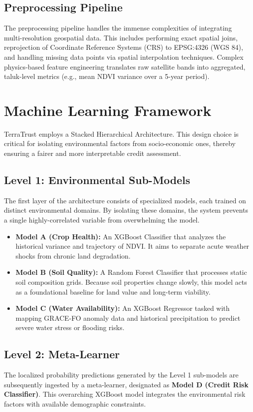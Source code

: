 \documentclass[conference]{IEEEtran}
\begin{document}
\subsection{Preprocessing Pipeline}
The preprocessing pipeline handles the immense complexities of integrating multi-resolution geospatial data. This includes performing exact spatial joins, reprojection of Coordinate Reference Systems (CRS) to EPSG:4326 (WGS 84), and handling missing data points via spatial interpolation techniques. Complex physics-based feature engineering translates raw satellite bands into aggregated, taluk-level metrics (e.g., mean NDVI variance over a 5-year period).

\section{\textbf{Machine Learning Framework}}
TerraTrust employs a Stacked Hierarchical Architecture. This design choice is critical for isolating environmental factors from socio-economic ones, thereby ensuring a fairer and more interpretable credit assessment.

\subsection{Level 1: Environmental Sub-Models}
The first layer of the architecture consists of specialized models, each trained on distinct environmental domains. By isolating these domains, the system prevents a single highly-correlated variable from overwhelming the model.

\begin{itemize}
    \item \textbf{Model A (Crop Health):} An XGBoost Classifier that analyzes the historical variance and trajectory of NDVI. It aims to separate acute weather shocks from chronic land degradation.
    \item \textbf{Model B (Soil Quality):} A Random Forest Classifier that processes static soil composition grids. Because soil properties change slowly, this model acts as a foundational baseline for land value and long-term viability.
    \item \textbf{Model C (Water Availability):} An XGBoost Regressor tasked with mapping GRACE-FO anomaly data and historical precipitation to predict severe water stress or flooding risks.
\end{itemize}

\subsection{Level 2: Meta-Learner}
The localized probability predictions generated by the Level 1 sub-models are subsequently ingested by a meta-learner, designated as \textbf{Model D (Credit Risk Classifier)}. This overarching XGBoost model integrates the environmental risk factors with available demographic constraints. 
\end{document}
